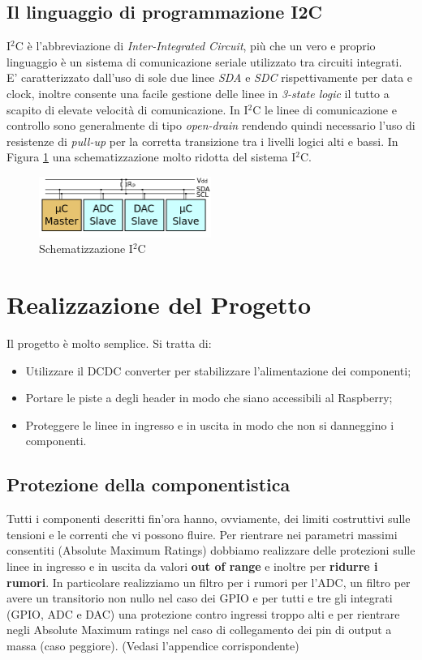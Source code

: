 \documentclass[10pt]{article}
\begin{document}
	\subsection{Il linguaggio di programmazione I2C}\label{sec:i2c}
		I\(^2\)C è l'abbreviazione di \emph{Inter-Integrated Circuit}, più che un vero e proprio linguaggio è un sistema di comunicazione seriale utilizzato tra circuiti integrati. E' caratterizzato dall'uso di sole due linee \emph{SDA} e \emph{SDC} rispettivamente per data e clock, inoltre consente una facile gestione delle linee in \emph{3-state logic} il tutto a scapito di elevate velocità di comunicazione.
		In I\(^2\)C le linee di comunicazione e controllo sono generalmente di tipo \emph{open-drain} rendendo quindi necessario l'uso di resistenze di \emph{pull-up} per la corretta transizione tra i livelli logici alti e bassi.
		In Figura \ref{fig:i2c} una schematizzazione molto ridotta del sistema I\(^2\)C.
		\begin{figure}[h]
		\centering
		\includegraphics[width=0.5\textwidth]{src/i2c}
		\caption{Schematizzazione I\(^2\)C}\label{fig:i2c}
		\end{figure}


\section{Realizzazione del Progetto}
		Il progetto è molto semplice. Si tratta di:
		\begin{itemize}
		        \item Utilizzare il DCDC converter per stabilizzare l'alimentazione dei componenti;
		        \item Portare le piste a degli header in modo che siano accessibili al Raspberry;
		        \item Proteggere le linee in ingresso e in uscita in modo che non si danneggino i componenti.
		\end{itemize}

	\subsection{Protezione della componentistica}
		Tutti i componenti descritti fin'ora hanno, ovviamente, dei limiti costruttivi sulle tensioni e le correnti che vi possono fluire. Per rientrare nei parametri massimi consentiti (Absolute Maximum Ratings) dobbiamo realizzare delle protezioni sulle linee in ingresso e in uscita da valori \textbf{out of range} e inoltre per \textbf{ridurre i rumori}.
		In particolare realizziamo un filtro per i rumori per l'ADC, un filtro per avere un transitorio non nullo nel caso dei GPIO e per tutti e tre gli integrati (GPIO, ADC e DAC) una protezione contro ingressi troppo alti e per rientrare negli Absolute Maximum ratings nel caso di collegamento dei pin di output a massa (caso peggiore).
		(Vedasi l'appendice corrispondente)
\end{document}
